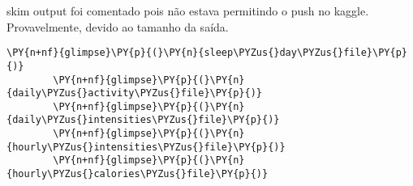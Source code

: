 skim output foi comentado pois não estava permitindo o push no kaggle.
Provavelmente, devido ao tamanho da saída.

\begin{tcolorbox}[breakable, size=fbox, boxrule=1pt, pad at break*=1mm,colback=cellbackground, colframe=cellborder]
    \begin{Verbatim}[commandchars=\\\{\}]
        \PY{n+nf}{glimpse}\PY{p}{(}\PY{n}{sleep\PYZus{}day\PYZus{}file}\PY{p}{)}
        \PY{n+nf}{glimpse}\PY{p}{(}\PY{n}{daily\PYZus{}activity\PYZus{}file}\PY{p}{)}
        \PY{n+nf}{glimpse}\PY{p}{(}\PY{n}{daily\PYZus{}intensities\PYZus{}file}\PY{p}{)}
        \PY{n+nf}{glimpse}\PY{p}{(}\PY{n}{hourly\PYZus{}intensities\PYZus{}file}\PY{p}{)}
        \PY{n+nf}{glimpse}\PY{p}{(}\PY{n}{hourly\PYZus{}calories\PYZus{}file}\PY{p}{)}
    \end{Verbatim}
\end{tcolorbox}

